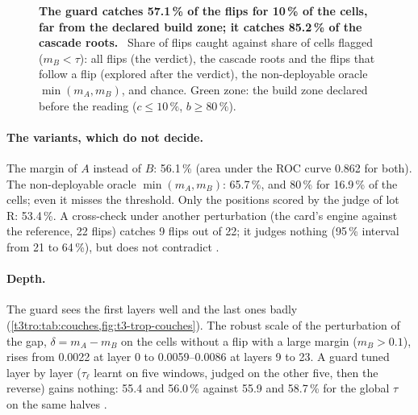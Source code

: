 \begin{figure}[tbp]
\centering
\GrapheTropicaleCourbe
\caption[The curve of the tropical guard]{\textbf{The guard catches 57.1\,\% of the flips for 10\,\% of the cells, far from the declared build zone; it catches 85.2\,\% of the cascade roots.} \mes~Share of flips caught against share of cells flagged ($m_B < \tau$): all flips (the verdict), the cascade roots and the flips that follow a flip (explored after the verdict), the non-deployable oracle $\min(m_A, m_B)$, and chance. Green zone: the build zone declared before the reading ($c \le 10\,\%$, $b \ge 80\,\%$). }
\label{fig:t3-trop-courbe}
\end{figure}

\paragraph{The variants, which do not decide.} The margin of $A$ instead of $B$: 56.1\,\% (area under the ROC curve 0.862 for both). The non-deployable oracle $\min(m_A, m_B)$: 65.7\,\%, and 80\,\% for 16.9\,\% of the cells; even it misses the threshold. Only the positions scored by the judge of lot R: 53.4\,\%. A cross-check under another perturbation (the card's engine against the reference, 22 flips) catches 9 flips out of 22; it judges nothing (95\,\% interval from 21 to 64\,\%), but does not contradict \mes.

\paragraph{Depth.} The guard sees the first layers well and the last ones badly (\cref{t3tro:tab:couches,fig:t3-trop-couches}). The robust scale of the perturbation of the gap, $\delta = m_A - m_B$ on the cells without a flip with a large margin ($m_B > 0.1$), rises from 0.0022 at layer 0 to 0.0059--0.0086 at layers 9 to 23. A guard tuned layer by layer ($\tau_\ell$ learnt on five windows, judged on the other five, then the reverse) gains nothing: 55.4 and 56.0\,\% against 55.9 and 58.7\,\% for the global $\tau$ on the same halves \mes.

